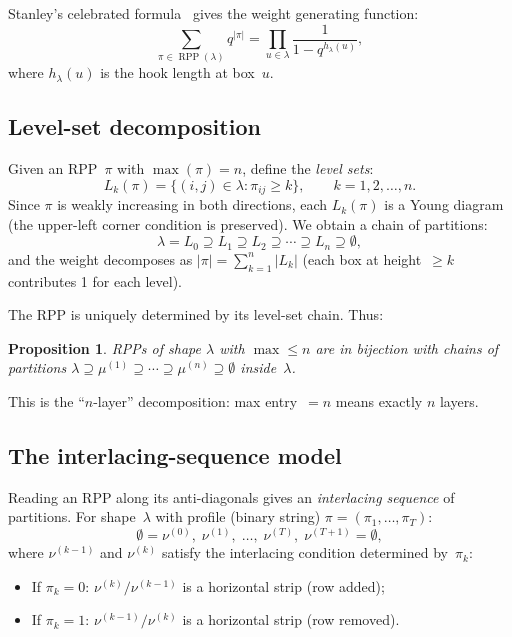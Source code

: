 \documentclass[11pt]{article}
\newtheorem{proposition}[theorem]{Proposition}
\newcommand{\RPP}{\operatorname{RPP}}
\begin{document}
Stanley's celebrated formula~\cite{stanley-1972} gives the
weight generating function:
\begin{equation}\label{eq:stanley-hook}
  \sum_{\pi \in \RPP(\lambda)} q^{|\pi|}
  = \prod_{u \in \lambda} \frac{1}{1 - q^{h_\lambda(u)}},
\end{equation}
where $h_\lambda(u)$ is the hook length at box~$u$.

\subsection{Level-set decomposition}

Given an RPP~$\pi$ with $\max(\pi) = n$, define the
\emph{level sets}:
\[
  L_k(\pi) = \{(i,j) \in \lambda : \pi_{ij} \geq k\},
  \qquad k = 1, 2, \ldots, n.
\]
Since $\pi$ is weakly increasing in both directions,
each $L_k(\pi)$ is a Young diagram (the upper-left corner
condition is preserved). We obtain a chain of partitions:
\begin{equation}\label{eq:level-chain}
  \lambda = L_0 \supseteq L_1 \supseteq L_2
  \supseteq \cdots \supseteq L_n \supseteq \emptyset,
\end{equation}
and the weight decomposes as
$|\pi| = \sum_{k=1}^{n} |L_k|$
(each box at height~$\geq k$ contributes 1 for each level).

The RPP is uniquely determined by its level-set chain.
Thus:

\begin{proposition}\label{prop:rpp-level-sets}
RPPs of shape $\lambda$ with $\max \leq n$ are in bijection
with chains of partitions
$\lambda \supseteq \mu^{(1)} \supseteq \cdots \supseteq
\mu^{(n)} \supseteq \emptyset$
inside~$\lambda$.
\end{proposition}

This is the ``$n$-layer'' decomposition: max entry~$= n$
means exactly $n$ layers.

\subsection{The interlacing-sequence model}

Reading an RPP along its anti-diagonals gives an
\emph{interlacing sequence} of partitions. For shape~$\lambda$
with profile (binary string) $\pi = (\pi_1, \ldots, \pi_T)$:
\[
  \emptyset = \nu^{(0)},\; \nu^{(1)},\; \ldots,\;
  \nu^{(T)},\; \nu^{(T+1)} = \emptyset,
\]
where $\nu^{(k-1)}$ and $\nu^{(k)}$ satisfy the interlacing
condition determined by~$\pi_k$:
\begin{itemize}
  \item If $\pi_k = 0$: $\nu^{(k)}/\nu^{(k-1)}$ is a
    horizontal strip (row added);
  \item If $\pi_k = 1$: $\nu^{(k-1)}/\nu^{(k)}$ is a
    horizontal strip (row removed).
\end{itemize}
\end{document}

